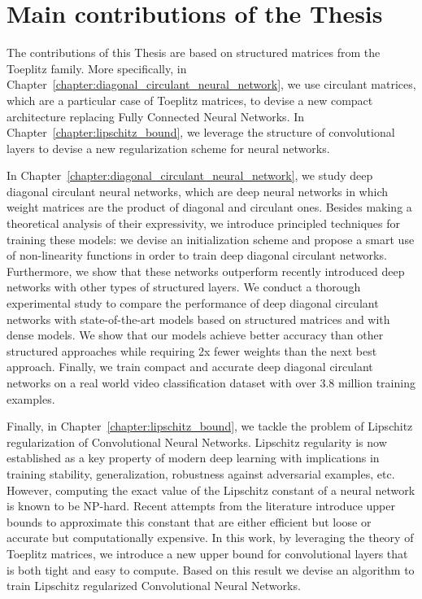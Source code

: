 
\section{Main contributions of the Thesis}

The contributions of this Thesis are based on structured matrices from the Toeplitz family.
More specifically, in Chapter~\ref{chapter:diagonal_circulant_neural_network}, we use circulant matrices, which are a particular case of Toeplitz matrices, to devise a new compact architecture replacing Fully Connected Neural Networks.
In Chapter~\ref{chapter:lipschitz_bound}, we leverage the structure of convolutional layers to devise a new regularization scheme for neural networks. 


In Chapter~\ref{chapter:diagonal_circulant_neural_network}, we study deep diagonal circulant neural networks, which are deep neural networks in which weight matrices are the product of diagonal and circulant ones.
Besides making a theoretical analysis of their expressivity, we introduce principled techniques for training these models: we devise an initialization scheme and propose a smart use of non-linearity functions in order to train deep diagonal circulant networks. 
Furthermore, we show that these networks outperform recently introduced deep networks with other types of structured layers.
We conduct a thorough experimental study to compare the performance of deep diagonal circulant networks with state-of-the-art models based on structured matrices and with dense models.
We show that our models achieve better accuracy than other structured approaches while requiring 2x fewer weights than the next best approach.
Finally, we train compact and accurate deep diagonal circulant networks on a real world video classification dataset with over 3.8 million training examples. 

Finally, in Chapter~\ref{chapter:lipschitz_bound}, we tackle the problem of Lipschitz regularization of Convolutional Neural Networks.
Lipschitz regularity is now established as a key property of modern deep learning with implications in training stability, generalization, robustness against adversarial examples, etc.
However, computing the exact value of the Lipschitz constant of a neural network is known to be NP-hard.
Recent attempts from the literature introduce upper bounds to approximate this constant that are either efficient but loose or accurate but computationally expensive.
In this work, by leveraging the theory of Toeplitz matrices, we introduce a new upper bound for convolutional layers that is both tight and easy to compute.
Based on this result we devise an algorithm to train Lipschitz regularized Convolutional Neural Networks.


